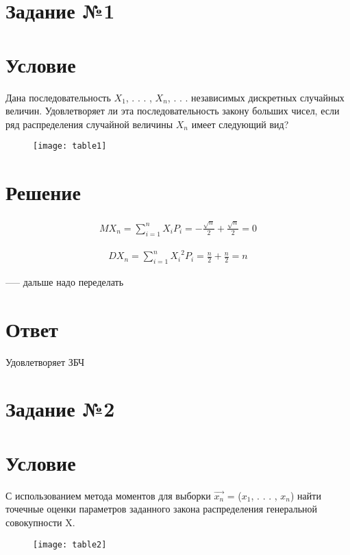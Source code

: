 
\section{Задание №1}
\section*{Условие} 
Дана последовательность \({X_1}\), . . . , \({X_n}\), . . . независимых дискретных случайных величин. Удовлетворяет ли эта последовательность закону больших чисел, если ряд распределения случайной величины \({X_n}\) имеет следующий вид?

\begin{figure}[h!]
	\begin{center}
		\texttt{[image: table1]}
	\end{center}
\end{figure}


\section*{Решение}
\begin{gather*} 
	MX_n = \sum_{i=1}^{n} X_iP_i = -\frac{\sqrt{n}}{2} + \frac{\sqrt{n}}{2} = 0
\end{gather*} 

\begin{gather*} 
	DX_n = \sum_{i=1}^{n} {X_i}^2P_i = \frac{n}{2} + \frac{n}{2} = n
\end{gather*}

-----
дальше надо переделать

\section*{Ответ} 
Удовлетворяет ЗБЧ

\section{Задание №2}
\section*{Условие} 
С использованием метода моментов для выборки \(\vec{x_n}\) = (\({x_1}\), . . . , \({x_n}\)) найти точечные оценки параметров заданного закона распределения генеральной совокупности X.
\begin{figure}[h!]
	\begin{center}
		\texttt{[image: table2]}
	\end{center}
\end{figure}

